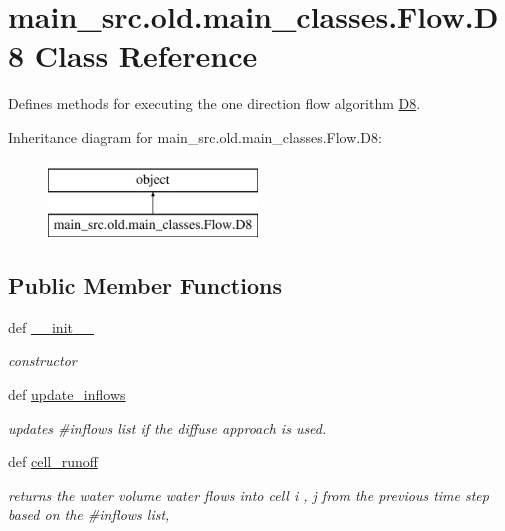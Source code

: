 \hypertarget{classmain__src_8old_1_1main__classes_1_1Flow_1_1D8}{\section{main\-\_\-src.\-old.\-main\-\_\-classes.\-Flow.\-D8 Class Reference}
\label{classmain__src_8old_1_1main__classes_1_1Flow_1_1D8}
}


Defines methods for executing the one direction flow algorithm \hyperlink{classmain__src_8old_1_1main__classes_1_1Flow_1_1D8}{D8}.  


Inheritance diagram for main\-\_\-src.\-old.\-main\-\_\-classes.\-Flow.\-D8\-:\begin{figure}[H]
\begin{center}
\leavevmode
\includegraphics[height=2.000000cm]{classmain__src_8old_1_1main__classes_1_1Flow_1_1D8}
\end{center}
\end{figure}
\subsection*{Public Member Functions}
\begin{DoxyCompactItemize}
\item 
def \hyperlink{classmain__src_8old_1_1main__classes_1_1Flow_1_1D8_afe4a84428657d47d47e5504f833ee28b}{\-\_\-\-\_\-init\-\_\-\-\_\-}
\begin{DoxyCompactList}\small\item\em constructor \end{DoxyCompactList}\item 
def \hyperlink{classmain__src_8old_1_1main__classes_1_1Flow_1_1D8_a67cf5b9bf1b46160ca57df855817e624}{update\-\_\-inflows}
\begin{DoxyCompactList}\small\item\em updates \#inflows list if the diffuse approach is used. \end{DoxyCompactList}\item 
def \hyperlink{classmain__src_8old_1_1main__classes_1_1Flow_1_1D8_a8ccd06cb2053c2f01b4d15056f988ab6}{cell\-\_\-runoff}
\begin{DoxyCompactList}\small\item\em returns the water volume water flows into cell i , j from the previous time step based on the \#inflows list, \par
\end{DoxyCompactList}\end{DoxyCompactItemize}

